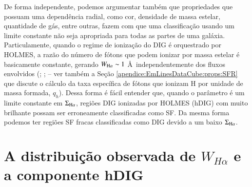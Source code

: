 De forma independente, podemos argumentar também que propriedades que possuam uma dependência radial, como cor, densidade de massa estelar, quantidade de gás, entre outras, fazem com que uma classificação usando um limite constante não seja apropriada para todas as partes de uma galáxia. Particulamente, quando o regime de ionização do DIG é orquestrado por HOLMES, a razão do número de fótons que podem ionizar \Ha por massa estelar é basicamente constante, gerando $W_{\Ha} \sim 1$ \AA\ independentemente dos fluxos envolvidos (\citealt{Binette.etal.1994a}; \citealt{CidFernandes.etal.2011a}; \citealt{Belfiore.etal.2016} -- ver também a Seção \ref{apendice:EmLinesDataCube:props:SFR} que discute o cálculo da taxa específica de fótons que ionizam H por unidade de massa formada, $q_h$). Dessa forma é fácil entender que, quando o parâmetro é um limite constante em $\Sigma_{\Ha}$, regiões DIG ionizadas por HOLMES (hDIG) com \Ha muito brilhante possam ser erroneamente classificadas como SF. Da mesma forma podemos ter regiões SF fracas classificadas como DIG devido a um baixo $\Sigma_{\Ha}$.



\section{A distribuição observada de $W_{H\alpha}$ e a componente hDIG}
\label{sec:DIGclass:WHaDistrib_hDIG}

